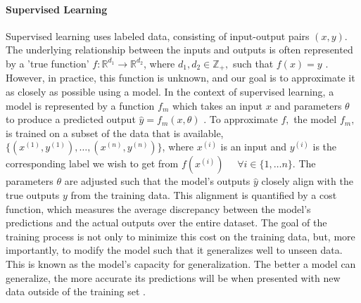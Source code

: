 \paragraph{Supervised Learning}
Supervised learning uses labeled data, consisting of input-output pairs $(x, y)$. The underlying relationship between the inputs and outputs is often represented by a 'true function' $f: \mathbb{R}^{d_{1}}\rightarrow \mathbb{R}^{d_{2}}$, where $d_{1}, d_{2} \in \mathbb{Z}_{+},$ such that $f(x)=y$ \cite{bishop2006}. However, in practice, this function is unknown, and our goal is to approximate it as closely as possible using a model. In the context of supervised learning, a model is represented by a function $f_{m}$ which takes an input $x$ and parameters $\theta$ to produce a predicted output $\hat{y}=f_{m}(x, \theta)$ \cite{Goodfellow-et-al-2016}. To approximate $f,$ the model $f_{m},$ is trained on a subset of the data that is available, $\{(x^{(1)},y^{(1)}),\ldots,(x^{(n)},y^{(n)})\}$, where $x^{(i)}$ is an input and $y^{(i)}$ is the corresponding label we wish to get from $f(x^{(i)}) \text{ } \text{ }\forall i\in\{1,\ldots n\}$. The parameters $\theta$ are adjusted such that the model's outputs $\hat{y}$ closely align with the true outputs $y$ from the training data. This alignment is quantified by a cost function, which measures the average discrepancy between the model's predictions and the actual outputs over the entire dataset. The goal of the training process is not only to minimize this cost on the training data, but, more importantly, to modify the model such that it generalizes well to unseen data. This is known as the model's capacity for generalization. The better a model can generalize, the more accurate its predictions will be when presented with new data outside of the training set \cite{james2013}.

